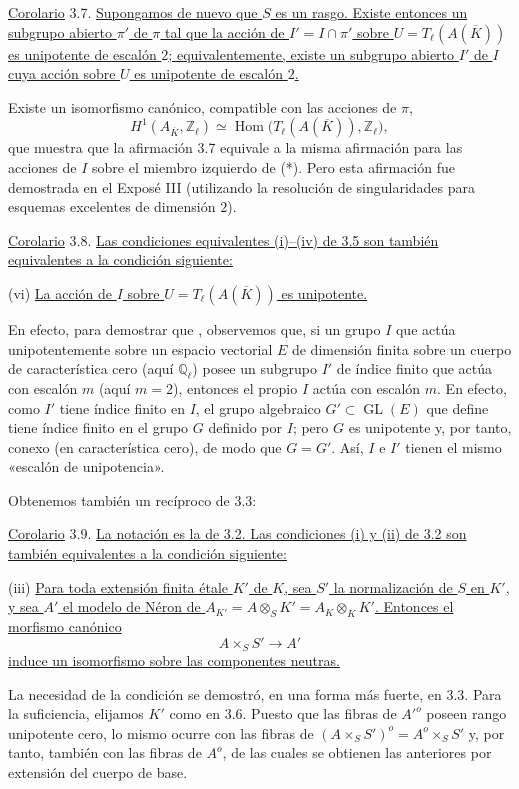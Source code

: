 \medskip
\noindent
\underline{Corolario} 3.7. \underline{Supongamos de nuevo que $S$ es un
rasgo. Existe entonces un subgrupo abierto $\pi'$ de $\pi$ tal que la
acción de $I'=I\cap\pi'$ sobre $U=T_\ell(A(\overline K))$ es unipotente
de escalón $2$; equivalentemente, existe un subgrupo abierto $I'$ de
$I$ cuya acción sobre $U$ es unipotente de escalón $2$.}

Existe un isomorfismo canónico, compatible con las acciones de $\pi$,
\begin{equation}\tag{*}
 H^1(A_{\overline K},\mathbb Z_\ell)
 \simeq
 \operatorname{Hom}\bigl(T_\ell(A(\overline K)),\mathbb Z_\ell\bigr),
\end{equation}
que muestra que la afirmación 3.7 equivale a la misma afirmación para
las acciones de $I$ sobre el miembro izquierdo de (*). Pero esta
afirmación fue demostrada en el Exposé III (utilizando la resolución de
singularidades para esquemas excelentes de dimensión $2$).

\medskip
\noindent
\underline{Corolario} 3.8. \underline{Las condiciones equivalentes
(i)--(iv) de 3.5 son también equivalentes a la condición siguiente:}

\smallskip
\noindent
(vi) \quad \underline{La acción de $I$ sobre
$U=T_\ell(A(\overline K))$ es unipotente.}

En efecto, para demostrar que , observemos que, si un grupo $I$ que actúa unipotentemente sobre
un espacio vectorial $E$ de dimensión finita sobre un cuerpo de
característica cero (aquí $\mathbb Q_\ell$) posee un subgrupo $I'$ de
índice finito que actúa con escalón $m$ (aquí $m=2$), entonces el propio
$I$ actúa con escalón $m$. En efecto, como $I'$ tiene índice finito en
$I$, el grupo algebraico $G'\subset\operatorname{GL}(E)$ que define
tiene índice finito en el grupo $G$ definido por $I$; pero $G$ es
unipotente y, por tanto, conexo (en característica cero), de modo que
$G=G'$. Así, $I$ e $I'$ tienen el mismo «escalón de unipotencia».

Obtenemos también un recíproco de 3.3:

\medskip
\noindent
\underline{Corolario} 3.9. \underline{La notación es la de 3.2. Las
condiciones (i) y (ii) de 3.2 son también equivalentes a la condición
siguiente:}

\smallskip
\noindent
(iii) \quad \underline{Para toda extensión finita étale $K'$ de $K$,
sea $S'$ la normalización de $S$ en $K'$, y sea $A'$ el modelo de Néron
de $A_{K'}=A\otimes_SK'=A_K\otimes_KK'$. Entonces el morfismo canónico}
\[
 A\times_SS'\longrightarrow A'
\]
\underline{induce un isomorfismo sobre las componentes neutras.}

La necesidad de la condición se demostró, en una forma más fuerte, en
3.3. Para la suficiencia, elijamos $K'$ como en 3.6. Puesto que las
fibras de ${A'}^o$ poseen rango unipotente cero, lo mismo ocurre con las
fibras de $(A\times_SS')^o=A^o\times_SS'$ y, por tanto, también con las
fibras de $A^o$, de las cuales se obtienen las anteriores por extensión
del cuerpo de base.
